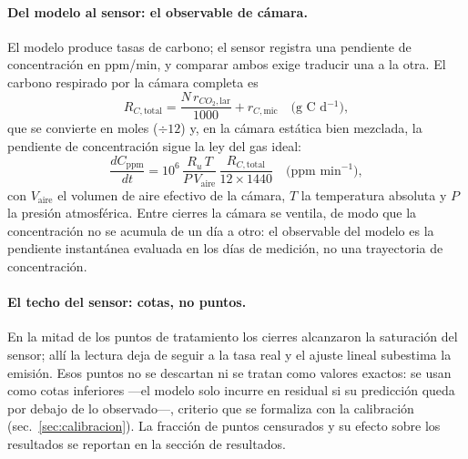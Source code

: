 \paragraph{Del modelo al sensor: el observable de cámara.}
El modelo produce tasas de carbono; el sensor registra una pendiente de concentración en ppm/min, y comparar ambos exige traducir una a la otra. El carbono respirado por la cámara completa es
\begin{equation}
  R_{C,\mathrm{total}} = \frac{N\,r_{CO_2,\mathrm{lar}}}{1000} + r_{C,\mathrm{mic}}
  \quad \text{(g C d$^{-1}$)},
  \label{eq:observable}
\end{equation}
que se convierte en moles ($\div 12$) y, en la cámara estática bien mezclada, la pendiente de concentración sigue la ley del gas ideal:
\begin{equation}
  \frac{dC_{\mathrm{ppm}}}{dt} = 10^{6}\,\frac{R_u\,T}{P\,V_{\mathrm{aire}}}\,\frac{R_{C,\mathrm{total}}}{12 \times 1440}
  \quad \text{(ppm min$^{-1}$)},
  \label{eq:gas-ideal}
\end{equation}
con $V_{\mathrm{aire}}$ el volumen de aire efectivo de la cámara, $T$ la temperatura absoluta y $P$ la presión atmosférica. Entre cierres la cámara se ventila, de modo que la concentración no se acumula de un día a otro: el observable del modelo es la pendiente instantánea evaluada en los días de medición, no una trayectoria de concentración.

\paragraph{El techo del sensor: cotas, no puntos.}
En la mitad de los puntos de tratamiento los cierres alcanzaron la saturación del sensor; allí la lectura deja de seguir a la tasa real y el ajuste lineal subestima la emisión. Esos puntos no se descartan ni se tratan como valores exactos: se usan como cotas inferiores ---el modelo solo incurre en residual si su predicción queda por debajo de lo observado---, criterio que se formaliza con la calibración (sec.~\ref{sec:calibracion}). La fracción de puntos censurados y su efecto sobre los resultados se reportan en la sección de resultados.

